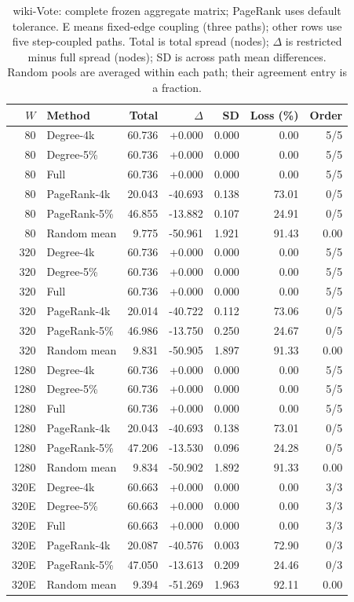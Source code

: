 \begin{table}[htbp]
\caption{wiki-Vote: complete frozen aggregate matrix; PageRank uses default tolerance. E means fixed-edge coupling (three paths); other rows use five step-coupled paths. Total is total spread (nodes); $\Delta$ is restricted minus full spread (nodes); SD is across path mean differences. Random pools are averaged within each path; their agreement entry is a fraction.}\label{tab:s-wiki_vote}
\begin{tabular}{rlrrrrr}
\toprule
$W$ & Method & Total & $\Delta$ & SD & Loss (\%) & Order \\
\midrule
80 & Degree-4k & 60.736 & +0.000 & 0.000 & 0.00 & 5/5 \\
80 & Degree-5\% & 60.736 & +0.000 & 0.000 & 0.00 & 5/5 \\
80 & Full & 60.736 & +0.000 & 0.000 & 0.00 & 5/5 \\
80 & PageRank-4k & 20.043 & -40.693 & 0.138 & 73.01 & 0/5 \\
80 & PageRank-5\% & 46.855 & -13.882 & 0.107 & 24.91 & 0/5 \\
80 & Random mean & 9.775 & -50.961 & 1.921 & 91.43 & 0.00 \\
320 & Degree-4k & 60.736 & +0.000 & 0.000 & 0.00 & 5/5 \\
320 & Degree-5\% & 60.736 & +0.000 & 0.000 & 0.00 & 5/5 \\
320 & Full & 60.736 & +0.000 & 0.000 & 0.00 & 5/5 \\
320 & PageRank-4k & 20.014 & -40.722 & 0.112 & 73.06 & 0/5 \\
320 & PageRank-5\% & 46.986 & -13.750 & 0.250 & 24.67 & 0/5 \\
320 & Random mean & 9.831 & -50.905 & 1.897 & 91.33 & 0.00 \\
1280 & Degree-4k & 60.736 & +0.000 & 0.000 & 0.00 & 5/5 \\
1280 & Degree-5\% & 60.736 & +0.000 & 0.000 & 0.00 & 5/5 \\
1280 & Full & 60.736 & +0.000 & 0.000 & 0.00 & 5/5 \\
1280 & PageRank-4k & 20.043 & -40.693 & 0.138 & 73.01 & 0/5 \\
1280 & PageRank-5\% & 47.206 & -13.530 & 0.096 & 24.28 & 0/5 \\
1280 & Random mean & 9.834 & -50.902 & 1.892 & 91.33 & 0.00 \\
320E & Degree-4k & 60.663 & +0.000 & 0.000 & 0.00 & 3/3 \\
320E & Degree-5\% & 60.663 & +0.000 & 0.000 & 0.00 & 3/3 \\
320E & Full & 60.663 & +0.000 & 0.000 & 0.00 & 3/3 \\
320E & PageRank-4k & 20.087 & -40.576 & 0.003 & 72.90 & 0/3 \\
320E & PageRank-5\% & 47.050 & -13.613 & 0.209 & 24.46 & 0/3 \\
320E & Random mean & 9.394 & -51.269 & 1.963 & 92.11 & 0.00 \\
\bottomrule
\end{tabular}
\end{table}
